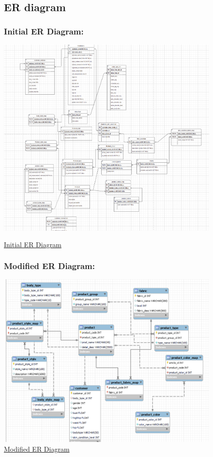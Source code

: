 \documentclass[11pt,journal,compsoc]{IEEEtran}
\begin{document}
\begin{figure}
    \subsection{ER diagram}
    \subsubsection{Initial ER Diagram:}
    \includegraphics[scale=0.375]{images/ERDiagram.png}
    \caption{\href{https://www.kaggle.com/datasets/odins0n/hm256x256}{ Initial ER Diagram}}
    \subsubsection{Modified ER Diagram:} 
    \includegraphics[scale=0.35]{images/ERdiagram_2.png}
    \caption{\href{https://www.kaggle.com/datasets/odins0n/hm256x256}{ Modified ER Diagram}}

\end{figure}
\end{document}
